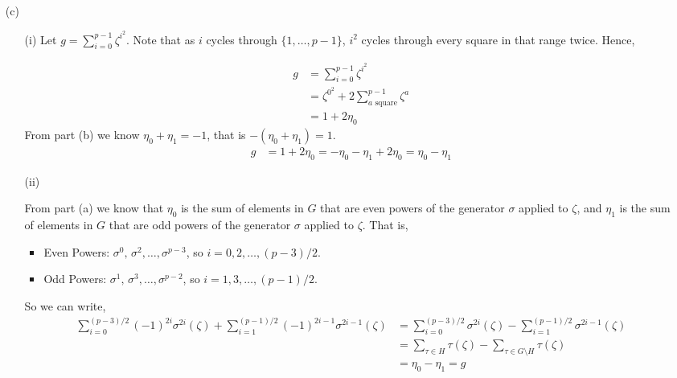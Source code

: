 \documentclass[12pt]{article}
\begin{document}
\begin{solution}
\begin{enumerate}
        \item [(c)] 
        \begin{enumerate}
            \item[(i)]  Let $g = \sum_{i=0}^{p-1} \zeta^{i^2}$. Note that as $i$ cycles through $\{1, \ldots, p-1\}$, $i^2$ cycles through every square in that range twice. Hence, 

                \begin{align*}
                    g &= \sum_{i=0}^{p-1} \zeta^{i^2} \\ 
                    &= \zeta^{0^2} + 2 \sum_{a \text{ square}}^{p-1} \zeta^{a}\\ 
                    &= 1 + 2 \eta_0
                \end{align*}
                From part (b) we know $\eta_0 + \eta_1 = -1$, that is $-(\eta_0 + \eta_1) = 1$. 
                \begin{align*}
                    g &= 1 + 2 \eta_0 = -\eta_0 - \eta_1 + 2 \eta_0 = \eta_0 - \eta_1
                \end{align*}
        
        
        \item[(ii)] 
        
        From part (a) we know that $\eta_0$ is the sum of elements in $G$ that are even powers of the generator $\sigma$ applied to $\zeta$, and $\eta_1$ is the sum of elements in $G$ that are odd powers of the generator $\sigma$ applied to $\zeta$. That is, 
            \begin{itemize}
                \item Even Powers: $\sigma^0, \, \sigma^2, \ldots, \sigma^{p-3}$, so $i = 0, 2, \ldots, (p-3)/2$.
                \item Odd Powers: $\sigma^1, \, \sigma^3, \ldots, \sigma^{p-2}$, so $i = 1, 3, \ldots, (p-1)/2$.
            \end{itemize}
            So we can write, 
            \begin{align*}
                \sum_{i=0}^{(p-3)/2} (-1)^{2i} \sigma^{2i}(\zeta) + \sum_{i=1}^{(p-1)/2} (-1)^{2i-1} \sigma^{2i-1}(\zeta) 
                &= \sum_{i=0}^{(p-3)/2} \sigma^{2i}(\zeta) - \sum_{i=1}^{(p-1)/2} \sigma^{2i-1}(\zeta)  \\
                &= \sum_{\tau \in H} \tau(\zeta) - \sum_{\tau \in G \setminus H} \tau(\zeta) \\ 
                &= \eta_0 - \eta_1 = g
            \end{align*}


\end{enumerate}
\end{enumerate}
\end{solution}
\end{document}
